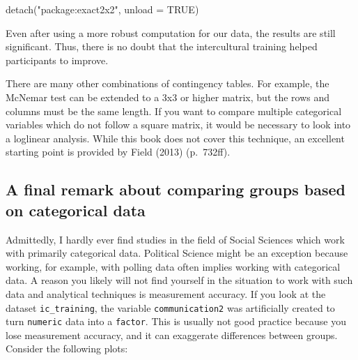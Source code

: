\documentclass[
  letterpaper,
]{krantz}
\makeatletter
\newenvironment{Shaded}{\begin{snugshade}}{\end{snugshade}}
\newcommand{\AttributeTok}[1]{\textcolor[rgb]{0.40,0.45,0.13}{#1}}
\newcommand{\ConstantTok}[1]{\textcolor[rgb]{0.56,0.35,0.01}{#1}}
\newcommand{\FunctionTok}[1]{\textcolor[rgb]{0.28,0.35,0.67}{#1}}
\newcommand{\NormalTok}[1]{\textcolor[rgb]{0.00,0.23,0.31}{#1}}
\newcommand{\StringTok}[1]{\textcolor[rgb]{0.13,0.47,0.30}{#1}}
\newenvironment{kframe}{%
\medskip{}
\setlength{\fboxsep}{.8em}
 \def\at@end@of@kframe{}%
 \ifinner\ifhmode%
  \def\at@end@of@kframe{\end{minipage}}%
  \begin{minipage}{\columnwidth}%
 \fi\fi%
 \def\FrameCommand##1{\hskip\@totalleftmargin \hskip-\fboxsep
 \colorbox{shadecolor}{##1}\hskip-\fboxsep
     \hskip-\linewidth \hskip-\@totalleftmargin \hskip\columnwidth}%
 \MakeFramed {\advance\hsize-\width
   \@totalleftmargin\z@ \linewidth\hsize
   \@setminipage}}%
 {\par\unskip\endMakeFramed%
 \at@end@of@kframe}
\renewenvironment{Shaded}{\begin{kframe}}{\end{kframe}}
\makeatother
\begin{document}
\begin{Shaded}
\begin{Highlighting}[]
\FunctionTok{detach}\NormalTok{(}\StringTok{"package:exact2x2"}\NormalTok{, }\AttributeTok{unload =} \ConstantTok{TRUE}\NormalTok{)}
\end{Highlighting}
\end{Shaded}

Even after using a more robust computation for our data, the results are
still significant. Thus, there is no doubt that the intercultural
training helped participants to improve.

There are many other combinations of contingency tables. For example,
the McNemar test can be extended to a 3x3 or higher matrix, but the rows
and columns must be the same length. If you want to compare multiple
categorical variables which do not follow a square matrix, it would be
necessary to look into a loglinear analysis. While this book does not
cover this technique, an excellent starting point is provided by Field
(2013) (p.~732ff).

\subsection{A final remark about comparing groups based on categorical
data}\label{sec-a-final-remark-about-comparing-groups-based-on-categorical-data}

Admittedly, I hardly ever find studies in the field of Social Sciences
which work with primarily categorical data. Political Science might be
an exception because working, for example, with polling data often
implies working with categorical data. A reason you likely will not find
yourself in the situation to work with such data and analytical
techniques is measurement accuracy. If you look at the dataset
\texttt{ic\_training}, the variable \texttt{communication2} was
artificially created to turn \texttt{numeric} data into a
\texttt{factor}. This is usually not good practice because you lose
measurement accuracy, and it can exaggerate differences between groups.
Consider the following plots:
\end{document}
